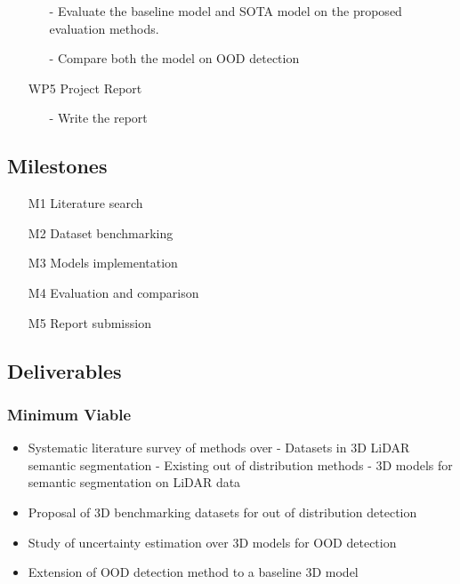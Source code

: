 \documentclass[thesis]{mas_proposal}
\begin{document}
\begin{enumerate}
\begin{itemize}
        \item[-] Evaluate the baseline model and SOTA model on the proposed evaluation methods.
        \item[-] Compare both the model on OOD detection
    \end{itemize} 
    \item[WP5] Project Report
    \begin{itemize}
        \item[-] Write the report
    \end{itemize} 
\end{enumerate}

\subsection{Milestones}
\begin{enumerate}
    \item[M1] Literature search
    \item[M2] Dataset benchmarking
    \item[M3] Models implementation
    \item[M4] Evaluation and comparison
    \item[M5] Report submission
\end{enumerate}



\subsection{Deliverables}
\subsubsection*{Minimum Viable}

\begin{itemize}
    \item Systematic literature survey of methods over
        \subitem- Datasets in 3D LiDAR semantic segmentation
        \subitem- Existing out of distribution methods 
        \subitem- 3D models for semantic segmentation on LiDAR data
    \item Proposal of 3D benchmarking datasets for out of distribution detection
    \item Study of uncertainty estimation over 3D models for OOD detection
    \item Extension of OOD detection method to a baseline 3D model
\end{itemize}
\end{document}
